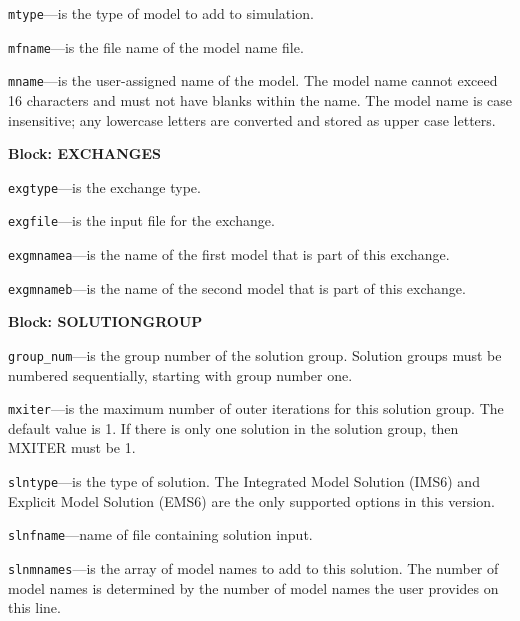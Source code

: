 \begin{description}
\item \texttt{mtype}---is the type of model to add to simulation.

\item \texttt{mfname}---is the file name of the model name file.

\item \texttt{mname}---is the user-assigned name of the model.  The model name cannot exceed 16 characters and must not have blanks within the name.  The model name is case insensitive; any lowercase letters are converted and stored as upper case letters.

\end{description}
\item \textbf{Block: EXCHANGES}

\begin{description}
\item \texttt{exgtype}---is the exchange type.

\item \texttt{exgfile}---is the input file for the exchange.

\item \texttt{exgmnamea}---is the name of the first model that is part of this exchange.

\item \texttt{exgmnameb}---is the name of the second model that is part of this exchange.

\end{description}
\item \textbf{Block: SOLUTIONGROUP}

\begin{description}
\item \texttt{group\_num}---is the group number of the solution group.  Solution groups must be numbered sequentially, starting with group number one.

\item \texttt{mxiter}---is the maximum number of outer iterations for this solution group.  The default value is 1.  If there is only one solution in the solution group, then MXITER must be 1.

\item \texttt{slntype}---is the type of solution.  The Integrated Model Solution (IMS6) and Explicit Model Solution (EMS6) are the only supported options in this version.

\item \texttt{slnfname}---name of file containing solution input.

\item \texttt{slnmnames}---is the array of model names to add to this solution.  The number of model names is determined by the number of model names the user provides on this line.

\end{description}

